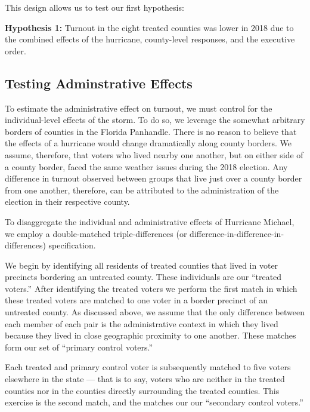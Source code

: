 \documentclass[
  12pt,
]{article}
\begin{document}
This design allows us to test our first hypothesis:

\textbf{Hypothesis 1:} Turnout in the eight treated counties was lower in 2018 due to the combined effects of the hurricane, county-level responses, and the executive order.

\hypertarget{testing-adminstrative-effects}{%
\subsection*{Testing Adminstrative Effects}\label{testing-adminstrative-effects}}

To estimate the administrative effect on turnout, we must control for the individual-level effects of the storm. To do so, we leverage the somewhat arbitrary borders of counties in the Florida Panhandle. There is no reason to believe that the effects of a hurricane would change dramatically along county borders. We assume, therefore, that voters who lived nearby one another, but on either side of a county border, faced the same weather issues during the 2018 election. Any difference in turnout observed between groups that live just over a county border from one another, therefore, can be attributed to the administration of the election in their respective county.

To disaggregate the individual and administrative effects of Hurricane Michael, we employ a double-matched triple-differences (or difference-in-difference-in-differences) specification.

We begin by identifying all residents of treated counties that lived in voter precincts bordering an untreated county. These individuals are our ``treated voters.'' After identifying the treated voters we perform the first match in which these treated voters are matched to one voter in a border precinct of an untreated county. As discussed above, we assume that the only difference between each member of each pair is the administrative context in which they lived because they lived in close geographic proximity to one another. These matches form our set of ``primary control voters.''

Each treated and primary control voter is subsequently matched to five voters elsewhere in the state --- that is to say, voters who are neither in the treated counties nor in the counties directly surrounding the treated counties. This exercise is the second match, and the matches our our ``secondary control voters.''
\end{document}
